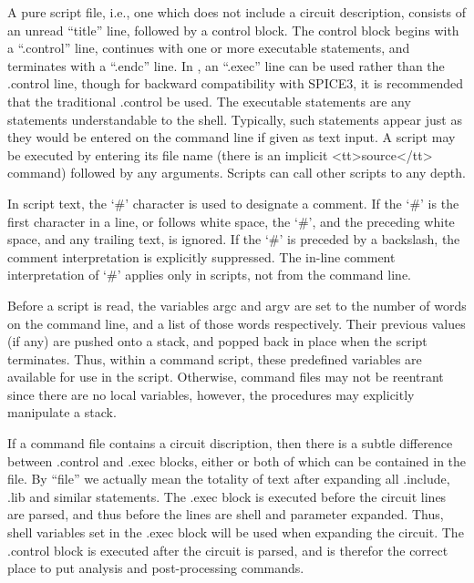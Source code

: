 A pure script file, i.e., one which does not include a circuit
description, consists of an unread ``title'' line, followed by a
control block.  The control block begins with a ``{\vt .control}''
line, continues with one or more executable statements, and terminates
with a ``{\vt .endc}'' line.  In {\WRspice}, an ``{\vt .exec}'' line
can be used rather than the {\vt .control} line, though for backward
compatibility with SPICE3, it is recommended that the traditional {\vt
.control} be used.  The executable statements are any statements
understandable to the {\WRspice} shell.  Typically, such statements
appear just as they would be entered on the command line if given as
text input.  A script may be executed by entering its file name (there
is an implicit <tt>source</tt> command) followed by any arguments. 
Scripts can call other scripts to any depth.

In script text, the `{\vt \#}' character is used to designate a
comment.  If the `{\vt \#}' is the first character in a line, or
follows white space, the `{\vt \#}', and the preceding white space,
and any trailing text, is ignored.  If the `{\vt \#}' is preceded by a
backslash, the comment interpretation is explicitly suppressed.  The
in-line comment interpretation of `{\vt \#}' applies only in scripts,
not from the command line.

Before a script is read, the variables {\et argc} and {\et argv} are
set to the number of words on the command line, and a list of those
words respectively.  Their previous values (if any) are pushed onto a
stack, and popped back in place when the script terminates.  Thus,
within a command script, these predefined variables are available for
use in the script.  Otherwise, command files may not be reentrant
since there are no local variables, however, the procedures may
explicitly manipulate a stack.

If a command file contains a circuit discription, then there is a
subtle difference between {\vt .control} and {\vt .exec} blocks,
either or both of which can be contained in the file.  By ``file'' we
actually mean the totality of text after expanding all {\vt .include},
{\vt .lib} and similar statements.  The {\vt .exec} block is executed
before the circuit lines are parsed, and thus before the lines are
shell and parameter expanded.  Thus, shell variables set in the {\vt
.exec} block will be used when expanding the circuit.  The {\vt
.control} block is executed after the circuit is parsed, and is
therefor the correct place to put analysis and post-processing
commands.

